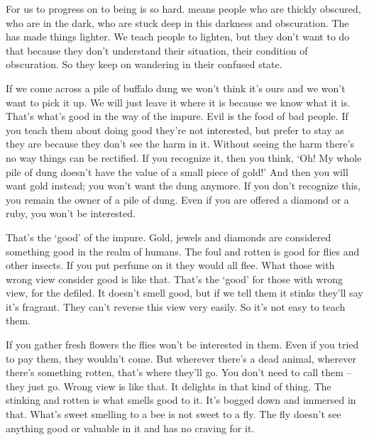 For us  to progress on to being  is so hard.  means people who are thickly obscured, who are in the dark, who are stuck deep in this darkness and obscuration. The  has made things lighter. We teach people to lighten, but they don't want to do that because they don't understand their situation, their condition of obscuration. So they keep on wandering in their confused state. 

If we come across a pile of buffalo dung we won't think it's ours and we won't want to pick it up. We will just leave it where it is because we know what it is. That's what's good in the way of the impure. Evil is the food of bad people. If you teach them about doing good they're not interested, but prefer to stay as they are because they don't see the harm in it. Without seeing the harm there's no way things can be rectified. If you recognize it, then you think, `Oh! My whole pile of dung doesn't have the value of a small piece of gold!' And then you will want gold instead; you won't want the dung anymore. If you don't recognize this, you remain the owner of a pile of dung. Even if you are offered a diamond or a ruby, you won't be interested. 

That's the `good' of the impure. Gold, jewels and diamonds are considered something good in the realm of humans. The foul and rotten is good for flies and other insects. If you put perfume on it they would all flee. What those with wrong view consider good is like that. That's the `good' for those with wrong view, for the defiled. It doesn't smell good, but if we tell them it stinks they'll say it's fragrant. They can't reverse this view very easily. So it's not easy to teach them. 

If you gather fresh flowers the flies won't be interested in them. Even if you tried to pay them, they wouldn't come. But wherever there's a dead animal, wherever there's something rotten, that's where they'll go. You don't need to call them -- they just go. Wrong view is like that. It delights in that kind of thing. The stinking and rotten is what smells good to it. It's bogged down and immersed in that. What's sweet smelling to a bee is not sweet to a fly. The fly doesn't see anything good or valuable in it and has no craving for it. 

